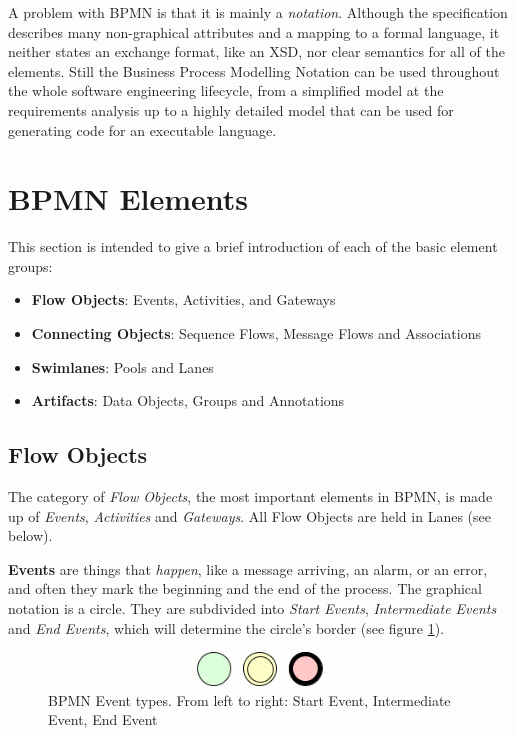 A problem with BPMN is that it is mainly a \emph{notation}.  Although the
specification describes many non-graphical attributes and a mapping to a formal
language, it neither states an exchange format, like an XSD, nor clear semantics
for all of the elements.  Still the Business Process Modelling Notation can be
used throughout the whole software engineering lifecycle, from a simplified model
at the requirements analysis up to a highly detailed model that can be used for
generating code for an executable language.



\section{BPMN Elements}
\label{sec:bpmn_elements}

This section is intended to give a brief introduction of each of the basic element
groups:

\begin{itemize}
	\item \textbf{Flow Objects}: Events, Activities, and Gateways
	\item \textbf{Connecting Objects}: Sequence Flows, Message Flows and Associations
	\item \textbf{Swimlanes}: Pools and Lanes
	\item \textbf{Artifacts}: Data Objects, Groups and Annotations
\end{itemize}

\subsection{Flow Objects}

The category of \emph{Flow Objects}, the most important elements in BPMN, is made
up of \emph{Events}, \emph{Activities} and \emph{Gateways}.  All Flow Objects are
held in Lanes (see below).

\textbf{Events} are things that \emph{happen}, like a message arriving, an alarm,
or an error, and often they mark the beginning and the end of the process.  The
graphical notation is a circle.  They are subdivided into \emph{Start Events},
\emph{Intermediate Events} and \emph{End Events}, which will determine the circle's
border (see figure \ref{fig:events}).

\begin{figure}[ht]
	\centering
	\includegraphics[width=.75\textwidth]{figures/bpmn/events.png}
	\caption[BPMN Event types]{BPMN Event types.  From left to right: Start Event,
	Intermediate Event, End Event}
	\label{fig:events}
\end{figure}

